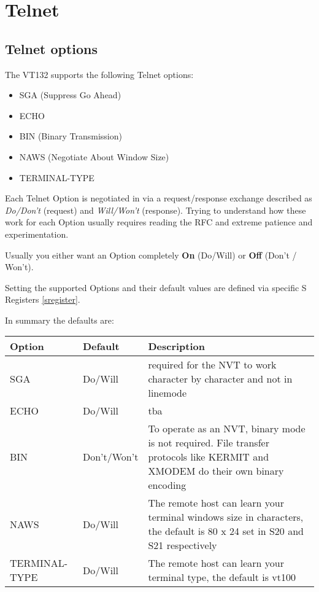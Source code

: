 
\newpage
\section{Telnet}

\subsection{Telnet options}

The VT132 supports the following Telnet options:

\begin{itemize}
	\item SGA (Suppress Go Ahead)
	\item ECHO
	\item BIN (Binary Transmission)
	\item NAWS (Negotiate About Window Size)
	\item TERMINAL-TYPE
\end{itemize}

Each Telnet Option is negotiated in via a request/response exchange described as \textit{Do/Don't} (request) and \textit{Will/Won't} (response).
Trying to understand how these work for each Option usually requires reading the RFC and extreme patience and experimentation.

Usually you either want an Option completely \textbf{On} (Do/Will) or \textbf{Off} (Don't / Won't).

Setting the supported Options and their default values are defined via specific S Registers \vref{sregister}.

In summary the defaults are:

\begin{tabular}{p{6em} | p{5.5em} | p{}}
\hline
\textbf{Option}	& \textbf{Default}	& \textbf{Description} \\
\hline
SGA				& Do/Will		& required for the NVT to work character by character and not in linemode \\
ECHO			& Do/Will		& tba \\
BIN				& Don't/Won't	& To operate as an NVT, binary mode is not required. File transfer protocols like KERMIT and XMODEM do their own binary encoding \\
NAWS			& Do/Will		& The remote host can learn your terminal windows size in characters, the default is 80 x 24 set in S20 and S21 respectively \\
TERMINAL-TYPE	& Do/Will		& The remote host can learn your terminal type, the default is vt100 \\
\hline
\end{tabular}
\bigskip

